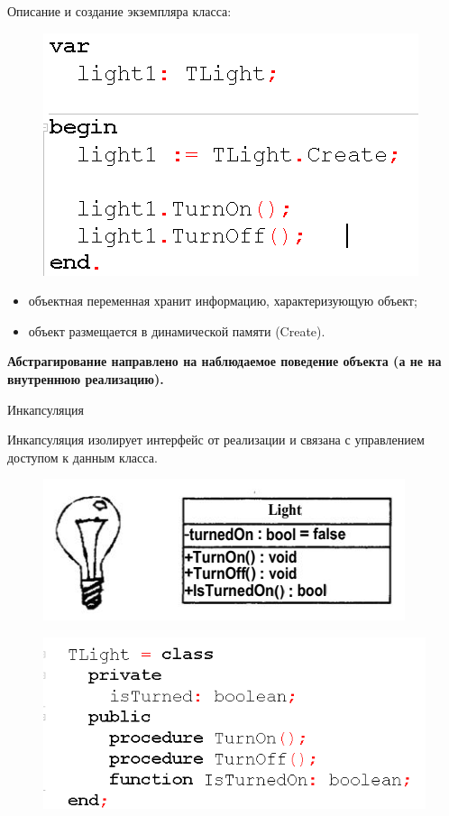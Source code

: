 \documentclass{beamer}
\begin{document}
\begin{frame}[t]
Описание и создание экземпляра класса:
\begin{figure}[h]
\centering
\includegraphics[scale=0.6]{images/lec04-pic06.png}
\end{figure}
\begin{itemize}
\item объектная переменная хранит информацию, характеризующую объект;
\item объект размещается в динамической памяти (Create).
\end{itemize}
\textbf{Абстрагирование направлено на наблюдаемое поведение объекта (а не на внутреннюю реализацию).}
\end{frame}

\begin{frame}{Инкапсуляция}
\begin{block}{Инкапсуляция}
изолирует интерфейс от реализации и связана с управлением доступом к данным класса.
\end{block}
\begin{figure}[h]
\centering
\includegraphics[scale=0.5]{images/lec04-pic07.png}
\end{figure}
\begin{figure}[h]
\centering
\includegraphics[scale=0.5]{images/lec04-pic08.png}
\end{figure}
\end{frame}
\end{document}
